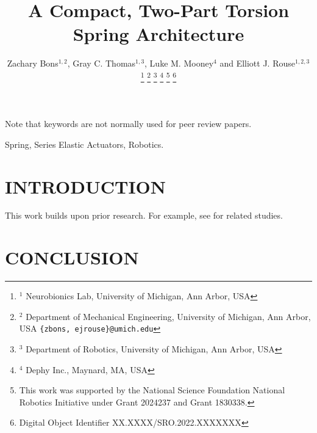 \documentclass[letterpaper, 10 pt, conference]{IEEEtran} %
\title{\LARGE \bf A Compact, Two-Part Torsion Spring Architecture}
\author{Zachary Bons$^{1,2}$, Gray C. Thomas$^{1,3}$, Luke M. Mooney$^{4}$ and Elliott J. Rouse$^{1,2,3}$%
\thanks{$^{1}$ Neurobionics Lab, University of Michigan, Ann Arbor, USA}%
\thanks{$^{2}$ Department of Mechanical Engineering, University of Michigan, Ann Arbor, USA {\tt\small \{zbons, ejrouse\}@umich.edu}}%
\thanks{$^{3}$ Department of Robotics, University of Michigan, Ann Arbor, USA}%
\thanks{$^{4}$ Dephy Inc., Maynard, MA, USA}%
\thanks{This work was supported by the National Science Foundation National Robotics Initiative under Grant 2024237 and Grant 1830338.}%
\thanks{Digital Object Identifier XX.XXXX/SRO.2022.XXXXXXX}
}
\begin{document}
\maketitle
\thispagestyle{empty}
\pagestyle{empty}

\begin{abstract}



\end{abstract}

Note that keywords are not normally used for peer review papers.
\begin{IEEEkeywords}
	Spring, Series Elastic Actuators, Robotics.
\end{IEEEkeywords}

\section{INTRODUCTION}

This work builds upon prior research. For example, see \cite{example_reference} for related studies.



\section{CONCLUSION}





\end{document}
